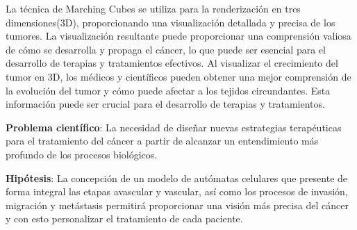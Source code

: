 La técnica de Marching Cubes \cite{lorensen1987} se utiliza para la renderización en tres dimensiones(3D), proporcionando una visualización detallada y precisa de los tumores. La visualización resultante puede proporcionar una comprensi\'on valiosa de cómo se desarrolla y propaga el cáncer, lo que puede ser esencial para el desarrollo de terapias y tratamientos efectivos. Al visualizar el crecimiento del tumor en 3D, los médicos y científicos pueden obtener una mejor comprensión de la evolución del tumor y cómo puede afectar a los tejidos circundantes. Esta información puede ser crucial para el desarrollo de terapias y tratamientos.

\hspace{.1cm}\textbf{Problema científico}: La necesidad de diseñar nuevas estrategias terapéuticas para el tratamiento del cáncer a partir de alcanzar un entendimiento más profundo de los procesos biológicos.

\hspace{.1cm}\textbf{Hipótesis}: La concepción de un modelo de autómatas celulares que presente de forma integral las etapas avascular y vascular, así como los procesos de invasión, migración y metástasis permitirá proporcionar una visión más precisa del cáncer y con esto personalizar el tratamiento de cada paciente.


